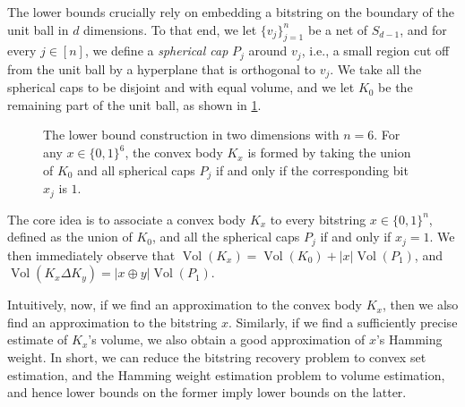 \documentclass[11pt]{article}
\DeclareMathOperator{\Vol}{Vol}
\begin{document}
    The lower bounds crucially rely on embedding a bitstring on the boundary of the unit ball in $d$ dimensions. To that end, we let $\{v_j\}_{j=1}^n$ be a net of $S_{d-1}$, and for every $j \in [n]$, we define a \textit{spherical cap} $P_j$ around $v_j$, i.e., a small region cut off from the unit ball by a hyperplane that is orthogonal to $v_j$. We take all the spherical caps to be disjoint and with equal volume, and we let $K_0$ be the remaining part of the unit ball, as shown in \cref{fig:lb-construction}.

    \begin{figure}[!ht]
        \centering
        \caption{The lower bound construction in two dimensions with $n = 6$. For any $x \in \{0,1\}^6$, the convex body $K_x$ is formed by taking the union of $K_0$ and all spherical caps $P_j$ if and only if the corresponding bit $x_j$ is $1$.}
        \label{fig:lb-construction}
    \end{figure}

    The core idea is to associate a convex body $K_x$ to every bitstring $x \in \{0,1\}^n$, defined as the union of $K_0$, and all the spherical caps $P_j$ if and only if $x_j = 1$. We then immediately observe that $\Vol(K_x) = \Vol(K_0) + |x|\Vol(P_1)$, and $\Vol(K_x \Delta K_y) = |x \oplus y| \Vol(P_1)$.

    Intuitively, now, if we find an approximation to the convex body $K_x$, then we also find an approximation to the bitstring $x$. Similarly, if we find a sufficiently precise estimate of $K_x$'s volume, we also obtain a good approximation of $x$'s Hamming weight. In short, we can reduce the bitstring recovery problem to convex set estimation, and the Hamming weight estimation problem to volume estimation, and hence lower bounds on the former imply lower bounds on the latter.
\end{document}
